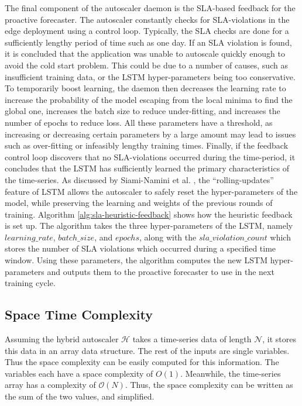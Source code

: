 The final component of the autoscaler daemon is the SLA-based feedback for the proactive forecaster. The autoscaler constantly checks for SLA-violations in the edge deployment using a control loop. Typically, the SLA checks are done for a sufficiently lengthy period of time such as one day. If an SLA violation is found, it is concluded that the application was unable to autoscale quickly enough to avoid the cold start problem. This could be due to a number of causes, such as insufficient training data, or the LSTM hyper-parameters being too conservative. To temporarily boost learning, the daemon then decreases the learning rate to increase the probability of the model escaping from the local minima to find the global one, increases the batch size to reduce under-fitting, and increases the number of epochs to reduce loss. All these parameters have a threshold, as increasing or decreasing certain parameters by a large amount may lead to issues such as over-fitting or infeasibly lengthy training times. Finally, if the feedback control loop discovers that no SLA-violations occurred during the time-period, it concludes that the LSTM has sufficiently learned the primary characteristics of the time-series. As discussed by Siami-Namini et al. \cite{siami2018comparison}, the ``rolling-updates'' feature of LSTM allows the autoscaler to safely reset the hyper-parameters of the model, while preserving the learning and weights of the previous rounds of training. Algorithm \ref{alg:sla-heuristic-feedback} shows how the heuristic feedback is set up. The algorithm takes the three hyper-parameters of the LSTM, namely $learning\_rate$, $batch\_size$, and $epochs$, along with the $sla\_violation\_count$ which stores the number of SLA violations which occurred during a specified time window. Using these parameters, the algorithm computes the new LSTM hyper-parameters and outputs them to the proactive forecaster to use in the next training cycle.\par

\subsection{Space Time Complexity}
\label{subsec:ch3-space-time-comp}

Assuming the hybrid autoscaler $\mathcal{H}$ takes a time-series data of length $\mathcal{N}$, it stores this data in an array data structure. The rest of the inputs are single variables. Thus the space complexity can be easily computed for this information. The variables each have a space complexity of $O(1)$. Meanwhile, the time-series array has a complexity of $\mathcal{O}(N)$. Thus, the space complexity can be written as the sum of the two values, and simplified.

